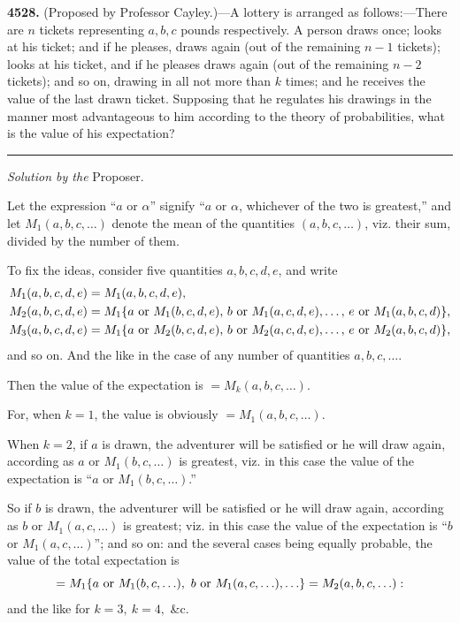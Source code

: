 \documentclass[10pt,twoside]{article}
\begin{document}
\noindent\textbf{4528.} (Proposed by Professor Cayley.)---A lottery is arranged
as follows:---There are \(n\) tickets representing \(a,b,c\) pounds
respectively. A person draws once; looks at his ticket; and if he pleases, draws
again (out of the remaining \(n-1\) tickets); looks at his ticket, and if he
pleases draws again (out of the remaining \(n-2\) tickets); and so on, drawing
in all not more than \(k\) times; and he receives the value of the last drawn
ticket. Supposing that he regulates his drawings in the manner most advantageous
to him according to the theory of probabilities, what is the value of his
expectation?

\begin{center}
\rule{0.25\linewidth}{0.4pt}

\textit{Solution by the} Proposer.
\end{center}

Let the expression ``\(a\) or \(\alpha\)'' signify ``\(a\) or \(\alpha\),
whichever of the two is greatest,'' and let \(M_1(a,b,c,\ldots)\) denote the
mean of the quantities \((a,b,c,\ldots)\), viz. their sum, divided by the
number of them.

To fix the ideas, consider five quantities \(a,b,c,d,e\), and write
\[
\begin{aligned}
M_1(a,b,c,d,e)&=M_1(a,b,c,d,e),\\
M_2(a,b,c,d,e)&=M_1\{a\hbox{ or }M_1(b,c,d,e),\,b\hbox{ or }M_1(a,c,d,e),
       \ldots,\,e\hbox{ or }M_1(a,b,c,d)\},\\
M_3(a,b,c,d,e)&=M_1\{a\hbox{ or }M_2(b,c,d,e),\,b\hbox{ or }M_2(a,c,d,e),
       \ldots,\,e\hbox{ or }M_2(a,b,c,d)\},
\end{aligned}
\]
and so on. And the like in the case of any number of quantities \(a,b,c,\ldots\).

Then the value of the expectation is \(=M_k(a,b,c,\ldots)\).

For, when \(k=1\), the value is obviously \(=M_1(a,b,c,\ldots)\).

\newpage

When \(k=2\), if \(a\) is drawn, the adventurer will be satisfied or he will
draw again, according as \(a\) or \(M_1(b,c,\ldots)\) is greatest, viz. in this
case the value of the expectation is ``\(a\) or \(M_1(b,c,\ldots)\).''

So if \(b\) is drawn, the adventurer will be satisfied or he will draw again,
according as \(b\) or \(M_1(a,c,\ldots)\) is greatest; viz. in this case the
value of the expectation is ``\(b\) or \(M_1(a,c,\ldots)\)''; and so on: and
the several cases being equally probable, the value of the total expectation is
\[
=M_1\{a\hbox{ or }M_1(b,c,\ldots),\ b\hbox{ or }M_1(a,c,\ldots),\ldots\}
 =M_2(a,b,c,\ldots):
\]
and the like for \(k=3,\ k=4,\) \&c.
\end{document}
